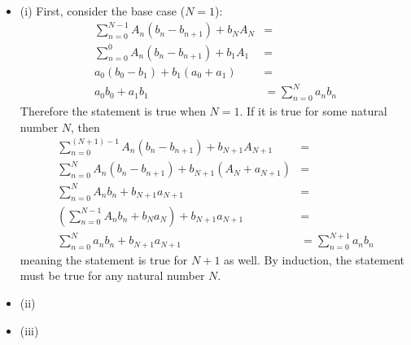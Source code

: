\documentclass[12pt]{article}
\begin{document}
\begin{itemize}
    \item (i) First, consider the base case ($N=1$):
        \begin{align*}
            \sum_{n=0}^{N-1} A_n (b_n - b_{n+1}) + b_N A_N &= \\
            \sum_{n=0}^{0} A_n (b_n - b_{n+1}) + b_1 A_1 &= \\
            a_0 (b_0 - b_1) + b_1 (a_0 + a_1) &= \\
            a_0 b_0 + a_1 b_1 &= \sum_{n=0}^N a_nb_n
        \end{align*}
        Therefore the statement is true when $N=1$. If it is true for some natural number $N$, then
        \begin{align*}
            \sum_{n=0}^{(N+1)-1} A_n (b_n - b_{n+1}) + b_{N+1} A_{N+1} &= \\
            \sum_{n=0}^{N} A_n (b_n - b_{n+1}) + b_{N+1} (A_N + a_{N+1}) &= \\
            \sum_{n=0}^{N} A_n b_n + b_{N+1} a_{N+1} &= \\
            \left( \sum_{n=0}^{N-1} A_n b_n + b_N a_N \right) + b_{N+1} a_{N+1} &= \\
            \sum_{n=0}^{N} a_n b_n + b_{N+1} a_{N+1} &= \sum_{n=0}^{N+1} a_n b_n
        \end{align*}
        meaning the statement is true for $N+1$ as well. By induction, the statement must be true for any natural number $N$.
    \item (ii)
    \item (iii)
\end{itemize}

\noindent{}\bigskip
\end{document}
